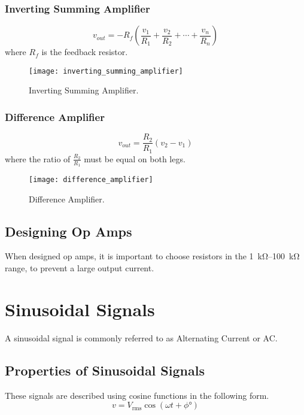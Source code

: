 \documentclass{article}
\begin{document}
\subsubsection{Inverting Summing Amplifier}
\begin{equation*}
    v_{out} = -R_f \left( \frac{v_1}{R_1} + \frac{v_2}{R_2} + \cdots + \frac{v_n}{R_n} \right)
\end{equation*}
where $R_f$ is the feedback resistor.
\begin{figure}[H]
    \centering
    \texttt{[image: inverting\_summing\_amplifier]}
    \caption{Inverting Summing Amplifier.}
\end{figure}
\subsubsection{Difference Amplifier}
\begin{equation*}
    v_{out} = \frac{R_2}{R_1} \left( v_2 - v_1 \right)
\end{equation*}
where the ratio of $\displaystyle \frac{R_2}{R_1}$ must be equal on both legs.
\begin{figure}[H]
    \centering
    \texttt{[image: difference\_amplifier]}
    \caption{Difference Amplifier.}
\end{figure}
\subsection{Designing Op Amps}
When designed op amps, it is important to choose resistors in the \SIrange{1}{100}{\kilo\ohm}
range, to prevent a large output current.
\newpage
\section{Sinusoidal Signals}
\begin{definition}
    A sinusoidal signal is commonly referred to as Alternating Current or AC. 
\end{definition}
\subsection{Properties of Sinusoidal Signals}
These signals are described using cosine functions in the following form.
\begin{equation*}
    v = V_{\mathrm{rms}} \cos{\left( \omega t + \phi\si{\degree} \right)}
\end{equation*}
\end{document}

